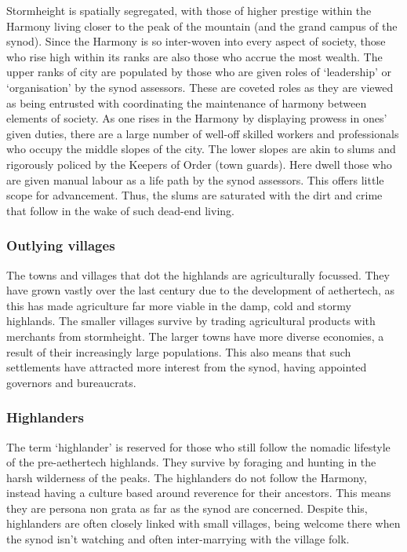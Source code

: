 \documentclass[a4paper,11pt,oneside]{book}
\begin{document}
Stormheight is spatially segregated, with those of higher prestige within the Harmony living closer to the peak of the mountain (and the grand campus of the synod). Since the Harmony is so inter-woven into every aspect of society, those who rise high within its ranks are also those who accrue the most wealth. The upper ranks of city are populated by those who are given roles of `leadership' or `organisation' by the synod assessors. These are coveted roles as they are viewed as being entrusted with coordinating the maintenance of harmony between elements of society. As one rises in the Harmony by displaying prowess in ones' given duties, there are a large number of well-off skilled workers and professionals who occupy the middle slopes of the city. The lower slopes are akin to slums and rigorously policed by the Keepers of Order (town guards). Here dwell those who are given manual labour as a life path by the synod assessors. This offers little scope for advancement. Thus, the slums are saturated with the dirt and crime that follow in the wake of such dead-end living.   

\subsubsection{Outlying villages}
The towns and villages that dot the highlands are agriculturally focussed. They have grown vastly over the last century due to the development of aethertech, as this has made agriculture far more viable in the damp, cold and stormy highlands. The smaller villages survive by trading agricultural products with merchants from stormheight. The larger towns have more diverse economies, a result of their increasingly large populations. This also means that such settlements have attracted more interest from the synod, having appointed governors and bureaucrats. 

\subsubsection{Highlanders}
The term `highlander' is reserved for those who still follow the nomadic lifestyle of the pre-aethertech highlands. They survive by foraging and hunting in the harsh wilderness of the peaks. The highlanders do not follow the Harmony, instead having a culture based around reverence for their ancestors. This means they are persona non grata as far as the synod are concerned. Despite this, highlanders are often closely linked with small villages, being welcome there when the synod isn't watching and often inter-marrying with the village folk.   
\end{document}
